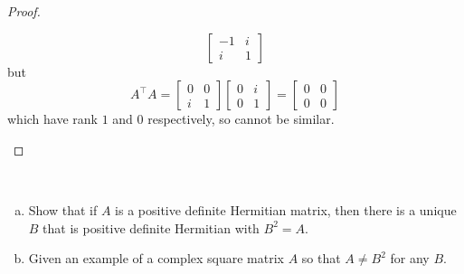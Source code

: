 \documentclass{article}
\begin{document}
\begin{proof}
\begin{enumerate}[(a)]
\[    \begin{bmatrix} -1 & i \\ i & 1\end{bmatrix}
  \] but \[
    A^\top A =
    \begin{bmatrix} 0 & 0 \\ i & 1\end{bmatrix}
    \begin{bmatrix} 0 & i \\ 0 & 1\end{bmatrix} =
    \begin{bmatrix} 0 & 0 \\ 0 & 0\end{bmatrix}
  \] which have rank $1$ and $0$ respectively, so cannot be similar.
\end{enumerate}
\end{proof}
\begin{problem}{3} ~
  \begin{enumerate}[(a)]
    \item Show that if $A$ is a positive definite Hermitian matrix, then there
    is a unique $B$ that is positive definite Hermitian with $B^2 = A$.
    \item Given an example of a complex square matrix $A$ so that $A \neq B^2$
    for any $B$.
  \end{enumerate}
\end{problem}
\end{document}
